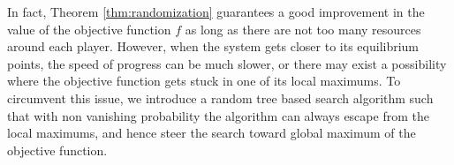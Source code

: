 In fact, Theorem \ref{thm:randomization} guarantees a good improvement in the value of the objective function $f$ as long as there are not too many resources around each player. However, when the system gets closer to its equilibrium points, the speed of progress can be much slower, or there may exist a possibility where the objective function gets stuck in one of its local maximums. To circumvent this issue, we introduce a random tree based search algorithm such that with non vanishing probability the algorithm can always escape from the local maximums, and hence steer the search toward global maximum of the objective function.

